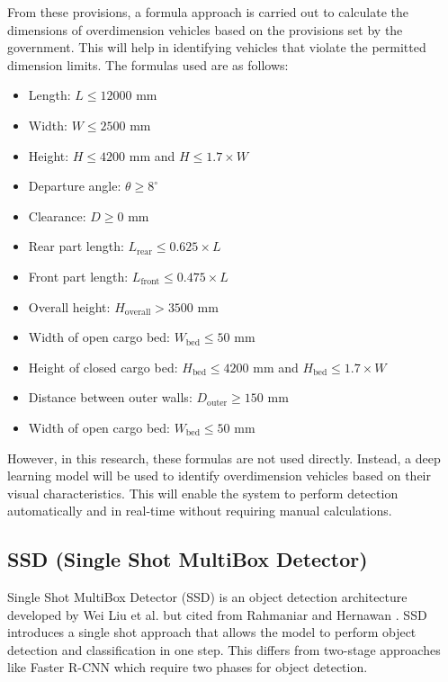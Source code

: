 From these provisions, a formula approach is carried out to calculate the dimensions of overdimension vehicles based on the provisions set by the government. This will help in identifying vehicles that violate the permitted dimension limits. The formulas used are as follows:

\begin{itemize}[nolistsep]
  \item Length: \( L \leq 12000 \) mm
  \item Width: \( W \leq 2500 \) mm
  \item Height: \( H \leq 4200 \) mm and \( H \leq 1.7 \times W \)
  \item Departure angle: \( \theta \geq 8^\circ \)
  \item Clearance: \( D \geq 0 \) mm
  \item Rear part length: \( L_{\mathrm{rear}} \leq 0.625 \times L \)
  \item Front part length: \( L_{\mathrm{front}} \leq 0.475 \times L \)
  \item Overall height: \( H_{\mathrm{overall}} > 3500 \) mm
  \item Width of open cargo bed: \( W_{\mathrm{bed}} \leq 50 \) mm
  \item Height of closed cargo bed: \( H_{\mathrm{bed}} \leq 4200 \) mm and \( H_{\mathrm{bed}} \leq 1.7 \times W \)
  \item Distance between outer walls: \( D_{\mathrm{outer}} \geq 150 \) mm
  \item Width of open cargo bed: \( W_{\mathrm{bed}} \leq 50 \) mm
\end{itemize}

However, in this research, these formulas are not used directly. Instead, a deep learning model will be used to identify overdimension vehicles based on their visual characteristics. This will enable the system to perform detection automatically and in real-time without requiring manual calculations.

\subsection{\textbf{SSD (Single Shot MultiBox Detector)}}

Single Shot MultiBox Detector (SSD) is an object detection architecture developed by Wei Liu et al. but cited from Rahmaniar and Hernawan \cite{Rahmaniar2021Real-Time}. SSD introduces a single shot approach that allows the model to perform object detection and classification in one step. This differs from two-stage approaches like Faster R-CNN which require two phases for object detection.

